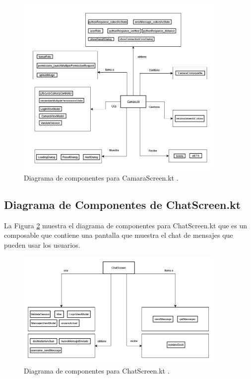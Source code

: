 \begin{figure}[htbp!]
	\begin{center}
		\includegraphics[width=0.9\textwidth]{DiagramasMoviles/DCM (14)}
		\caption{Diagrama de componentes para CamaraScreen.kt .}
		\label{fig:Componentes_2}
	\end{center}
\end{figure}

\newpage

\subsection{Diagrama de Componentes de ChatScreen.kt}

La Figura \ref{fig:Componentes_3} muestra el diagrama de componentes para ChatScreen.kt que es un composable que contiene una pantalla que muestra el chat de mensajes que pueden usar los usuarios.

\begin{figure}[htbp!]
	\begin{center}
		\includegraphics[width=0.9\textwidth]{DiagramasMoviles/DCM (15)}
		\caption{Diagrama de componentes para ChatScreen.kt .}
		\label{fig:Componentes_3}
	\end{center}
\end{figure}


